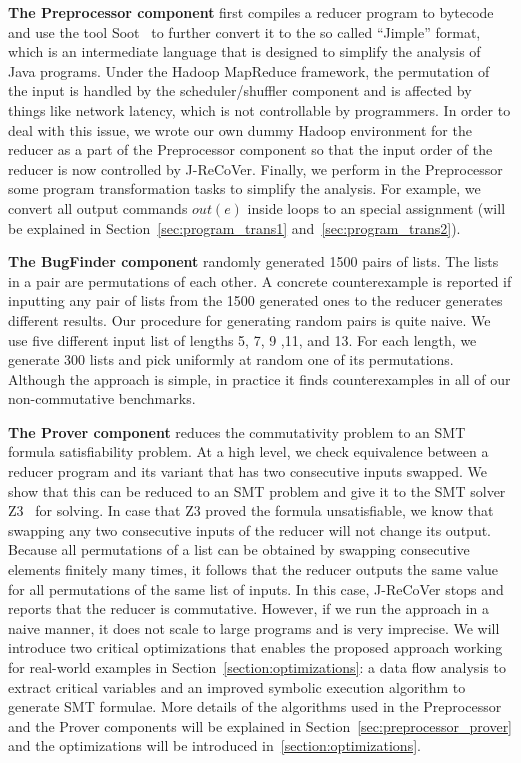 \documentclass{llncs}
\begin{document}
\textbf{The Preprocessor component} first compiles a reducer program to bytecode and use the tool Soot~\cite{soot} to further convert it to the so called ``Jimple'' format, which is an intermediate language that is designed to simplify the analysis of Java programs. Under the Hadoop MapReduce framework, the permutation of the input is handled by the scheduler/shuffler component and is affected by things like network latency, which is not controllable by programmers. In order to deal with this issue, we wrote our own dummy Hadoop environment for the reducer as a part of the Preprocessor component so that the input order of the reducer is now controlled by J-ReCoVer. Finally, we perform in the Preprocessor some program transformation tasks to simplify the analysis. For example, we convert all output commands $out(e)$ inside loops to an special assignment (will be explained in Section~\ref{sec:program_trans1} and~\ref{sec:program_trans2}).

\textbf{The BugFinder component} randomly generated 1500 pairs of lists. The lists in a pair are permutations of each other. A concrete counterexample is reported if inputting any pair of lists from the 1500 generated ones to the reducer generates different results.
Our procedure for generating random pairs is quite naive. We use five different input list of lengths 5, 7, 9 ,11, and 13. For each length, we generate 300 lists and pick uniformly at random one of its permutations. Although the approach is simple, in practice it finds counterexamples in all of our non-commutative benchmarks.

\textbf{The Prover component} reduces the commutativity problem to an SMT formula satisfiability problem. At a high level, we check equivalence between a reducer program and its variant that has two consecutive inputs swapped. We show that this can be reduced to an SMT problem and give it to the SMT solver Z3~\cite{z3} for solving. In case that Z3 proved the formula unsatisfiable, we know that swapping any two consecutive inputs of the reducer will not change its output. Because all permutations of a list can be obtained by swapping consecutive elements finitely many times, it follows that the reducer outputs the same value for all permutations of the same list of inputs.
In this case,  J-ReCoVer stops and reports that the reducer is commutative. 
However, if we run the approach in a naive manner, it does not scale to large programs and is very imprecise.  We will introduce two critical optimizations that enables the proposed approach working for real-world examples in Section~\ref{section:optimizations}: a data flow analysis to extract critical variables and an improved symbolic execution algorithm to generate SMT formulae. More details of the algorithms used in the Preprocessor and the Prover components will be explained in Section~\ref{sec:preprocessor_prover} and the optimizations will be introduced in~\ref{section:optimizations}. 
\end{document}

